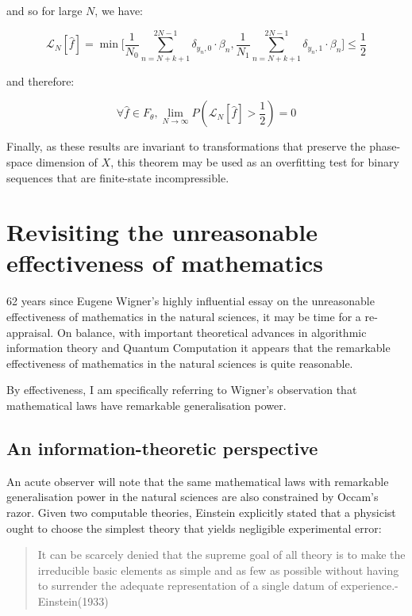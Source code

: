 \documentclass{article}
\begin{document}
and so for large $N$, we have: 

\begin{equation}
\mathcal{L}_N[\hat{f}] = \min \Big[\frac{1}{N_0} \sum_{n=N+k+1}^{2N-1} \delta_{y_n,0} \cdot \beta_n,  \frac{1}{N_1} \sum_{n=N+k+1}^{2N-1} \delta_{y_n,1} \cdot \beta_n \Big] \leq \frac{1}{2}
\end{equation}

and therefore:

\begin{equation}
\forall \hat{f} \in F_{\theta}, \lim_{N \to \infty} P(\mathcal{L}_N[\hat{f}] > \frac{1}{2}) = 0
\end{equation}

Finally, as these results are invariant to transformations that preserve the 
phase-space dimension of $X$, this theorem may be used as an overfitting test 
for binary sequences that are finite-state incompressible. 

\newpage

\section{Revisiting the unreasonable effectiveness of mathematics}

62 years since Eugene Wigner's highly influential essay on the unreasonable effectiveness of mathematics in
the natural sciences, it may be time for a re-appraisal. On balance, with important theoretical advances
in algorithmic information theory and Quantum Computation it appears that the remarkable effectiveness of mathematics
in the natural sciences is quite reasonable.

By effectiveness, I am specifically referring to Wigner's observation that mathematical laws have remarkable generalisation
power.

\subsection{An information-theoretic perspective}

An acute observer will note that the same mathematical laws
with remarkable generalisation power in the natural sciences are also constrained by Occam's razor. Given two computable theories, Einstein explicitly
stated that a physicist ought to choose the simplest theory that yields negligible experimental error:

\begin{quote}
It can be scarcely denied that the supreme goal of all theory is to make the irreducible basic elements as simple
and as few as possible without having to surrender the adequate representation of a single datum of experience.-Einstein(1933)
\end{quote}
\end{document}
